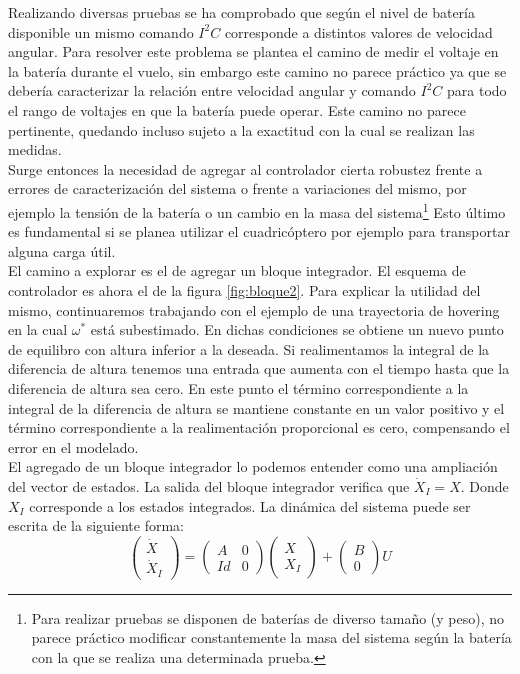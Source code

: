 \documentclass[main]{subfiles}
\begin{document}
Realizando diversas pruebas se ha comprobado que seg\'un el nivel de bater\'ia disponible un mismo comando $I^2C$ corresponde a distintos valores de velocidad angular. Para resolver este problema se plantea el camino de medir el voltaje en la bater\'ia durante el vuelo, sin embargo este camino no parece pr\'actico ya que se deber\'ia caracterizar la relaci\'on entre velocidad angular y comando $I^2C$ para todo el rango de voltajes en que la bater\'ia puede operar. Este camino no parece pertinente, quedando incluso sujeto a la exactitud con la cual se realizan las medidas.\\

Surge entonces la necesidad de agregar al controlador cierta robustez frente a errores de caracterizaci\'on del sistema o frente a variaciones del mismo, por ejemplo la tensi\'on de la bater\'ia o un cambio en la masa del sistema\footnote{Para realizar pruebas se disponen de bater\'ias de diverso tamaño (y peso), no parece pr\'actico modificar constantemente la masa del sistema seg\'un la bater\'ia con la que se realiza una determinada prueba.} Esto \'ultimo es fundamental si se planea utilizar el cuadric\'optero por ejemplo para transportar alguna carga \'util.\\

El camino a explorar es el de agregar un bloque integrador. El esquema de controlador es ahora el de la figura \ref{fig:bloque2}. Para explicar la utilidad del mismo, continuaremos trabajando con el ejemplo de una trayectoria de hovering en la cual $\omega^*$ est\'a subestimado. En dichas condiciones se obtiene un nuevo punto de equilibro con altura inferior a la deseada. Si realimentamos la integral de la diferencia de altura tenemos una entrada que aumenta con el tiempo hasta que la diferencia de altura sea cero. En este punto el t\'ermino correspondiente a la integral de la diferencia de altura se mantiene constante en un valor positivo y el t\'ermino correspondiente a la realimentaci\'on proporcional es cero, compensando el error en el modelado.\\

El agregado de un bloque integrador lo podemos entender como una ampliaci\'on del vector de estados. La salida del bloque integrador verifica que $\dot{X}_I = X$. Donde $X_I$ corresponde a los estados integrados. La din\'amica del sistema puede ser escrita de la siguiente forma:
\begin{equation}
\label{eq:integrador}
\left(\begin{array}{c}
\dot{X}\\
\dot{X}_I
\end{array}\right) = \left( \begin{array}{cc}
A & 0\\
Id & 0
\end{array}\right)\left(\begin{array}{c}
X\\
X_I
\end{array}\right) + \left(\begin{array}{c}
B\\
0
\end{array}\right)U
\end{equation}  
 
\end{document}
